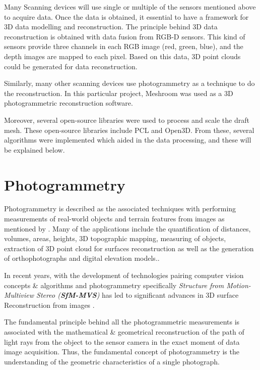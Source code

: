 \documentclass[12pt]{report}
\begin{document}
Many Scanning devices will use single or multiple of the sensors mentioned above to acquire data. Once the data is obtained, it essential to have a framework for 3D data modelling and reconstruction.
The principle behind 3D data reconstruction is obtained with data fusion from RGB-D sensors. This kind of sensors provide three channels in each RGB image (red, green, blue), and the depth images are mapped to each pixel. Based on this data, 3D point clouds could be generated for data reconstruction.

Similarly, many other scanning devices use photogrammetry as a technique to do the reconstruction. In this particular project, Meshroom was used as a 3D photogrammetric reconstruction software.

Moreover, several open-source libraries were used to process and scale the draft mesh. These open-source libraries include PCL and Open3D. From these, several algorithms were implemented which aided in the data processing, and these will be explained below. 
\enlargethispage{\baselineskip}



\section{Photogrammetry}
Photogrammetry is described as the associated techniques with performing measurements of real-world objects and terrain features from images as mentioned by .
Many of the applications include the quantification of distances, volumes, areas, heights, 3D topographic mapping, measuring of objects, extraction of 3D point cloud for surfaces reconstruction as well as the generation of orthophotographs and digital elevation models..

In recent years, with the development of technologies pairing computer vision concepts \& algorithms and photogrammetry specifically \textit{Structure from Motion-Multiview Stereo (\textbf{SfM-MVS})}
has led to significant advances in 3D surface Reconstruction from images .

The fundamental principle behind all the photogrammetric measurements is associated with the mathematical \& geometrical reconstruction of the path of light rays from the object to the sensor camera in the exact moment of data image acquisition.
Thus, the fundamental concept of photogrammetry is the understanding of the geometric characteristics of a single photograph.
\end{document}
